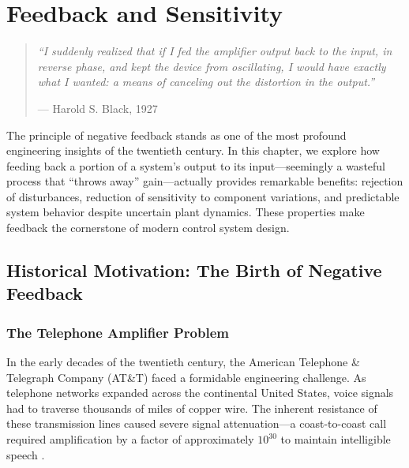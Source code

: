 
\setcounter{chapter}{8}

\chapter{Feedback and Sensitivity}
\label{ch:feedback_sensitivity}

\begin{quote}
\textit{``I suddenly realized that if I fed the amplifier output back to the input, in reverse phase, and kept the device from oscillating, I would have exactly what I wanted: a means of canceling out the distortion in the output.''}

\hfill --- Harold S. Black, 1927
\end{quote}

\vspace{1em}

\noindent The principle of negative feedback stands as one of the most profound engineering insights of the twentieth century. In this chapter, we explore how feeding back a portion of a system's output to its input---seemingly a wasteful process that ``throws away'' gain---actually provides remarkable benefits: rejection of disturbances, reduction of sensitivity to component variations, and predictable system behavior despite uncertain plant dynamics. These properties make feedback the cornerstone of modern control system design.

\section{Historical Motivation: The Birth of Negative Feedback}
\label{sec:historical_motivation}

\subsection{The Telephone Amplifier Problem}

In the early decades of the twentieth century, the American Telephone \& Telegraph Company (AT\&T) faced a formidable engineering challenge. As telephone networks expanded across the continental United States, voice signals had to traverse thousands of miles of copper wire. The inherent resistance of these transmission lines caused severe signal attenuation---a coast-to-coast call required amplification by a factor of approximately $10^{30}$ to maintain intelligible speech \cite{black1934}.

